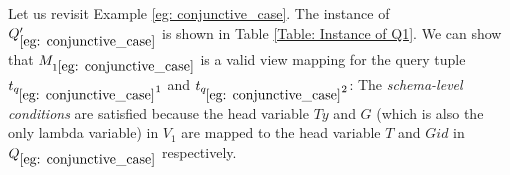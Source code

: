 \begin{example}\label{eg: conditions_conjunctive}
Let us revisit Example \ref{eg: conjunctive_case}. The instance of $Q_{\ref{eg: conjunctive_case}}'$ is shown in Table \ref{Table: Instance of Q1}. We can show that $M_{1\ref{eg: conjunctive_case}}$ is a valid view mapping for the query tuple $t_{q_{\ref{eg: conjunctive_case}}1}$ and $t_{q_{\ref{eg: conjunctive_case}}2}$: The {\em schema-level conditions} are satisfied because the head variable $Ty$ and $G$ (which is also the only lambda variable) in $V_1$ are mapped to the head variable $T$ and $Gid$ in $Q_{\ref{eg: conjunctive_case}}$ respectively. %


\end{example}
